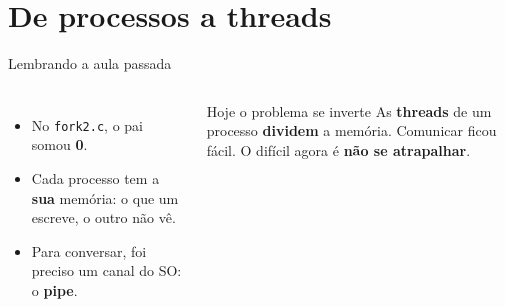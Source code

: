 \documentclass[aspectratio=169]{beamer}
\begin{document}
\section{De processos a threads}

\begin{frame}{Lembrando a aula passada}
\begin{columns}[c]
\begin{itemize}
    \item No \texttt{fork2.c}, o pai somou \textbf{0}.
    \item Cada processo tem a \textbf{sua} memória: o que um escreve, o outro não vê.
    \item Para conversar, foi preciso um canal do SO: o \textbf{pipe}.
\end{itemize}

\begin{alertblock}{Hoje o problema se inverte}
As \textbf{threads} de um processo \textbf{dividem} a memória. Comunicar ficou fácil. O difícil agora é \textbf{não se atrapalhar}.
\end{alertblock}
\end{columns}
\end{frame}
\end{document}
